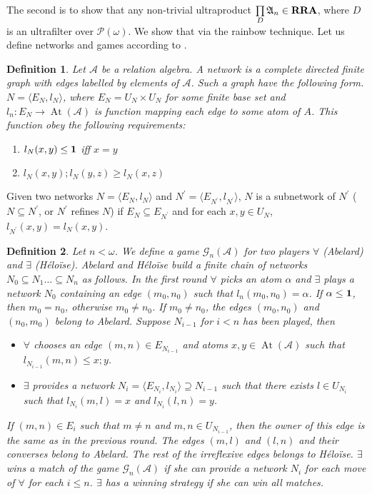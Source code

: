 \documentclass[a4paper]{article}
\theoremstyle{defin}
\newtheorem{defin}{Definition}
\theoremstyle{theorem}
\theoremstyle{prop}
\theoremstyle{lemma}
\theoremstyle{ex}
\theoremstyle{col}
\begin{document}
The second is to show that any non-trivial ultraproduct $\prod \limits_{D} \mathfrak{A}_n \in {\bf RRA}$, where $D$ is an ultrafilter over $\mathcal{P}(\omega)$. We show that via the rainbow technique. Let us define networks and games according to \cite{hirsch1997step}.

\begin{defin}
  Let $\mathcal{A}$ be a relation algebra. A network is a complete directed finite graph with edges labelled by elements of $\mathcal{A}$. Such a graph have the following form. $N = \langle E_N, l_N \rangle$, where $E_N = U_N \times U_N$ for some finite base set and $l_n : E_N \to \operatorname{At}(\mathcal{A})$ is function mapping each edge to some atom of $A$. This function obey the following requirements:
  \begin{enumerate}
    \item $l_N(x,y) \leq {\bf 1}$ iff $x = y$
    \item $l_N(x, y) ; l_N(y,z) \geq l_N(x,z)$
  \end{enumerate}
\end{defin}
Given two networks $N = \langle E_N, l_N \rangle$ and $N^{'} = \langle E_{N^{'}}, l_{N^{'}} \rangle$, $N$ is a subnetwork of $N^{'}$ ($N \subseteq N^{'}$, or $N^{'}$ refines $N$) if $E_N \subseteq E_{N^{'}}$ and for each $x,y \in U_N$, $l_{N^{'}}(x,y) = l_{N}(x,y)$.

\begin{defin}
  Let $n < \omega$. We define a game $\mathcal{G}_n(\mathcal{A})$ for two players $\forall$ (Abelard) and $\exists$ (H\'{e}lo\"{i}se). Abelard and H\'{e}lo\"{i}se build a finite chain of networks $N_0 \subseteq N_1 \dots \subseteq N_n$ as follows. In the first round $\forall$ picks an atom $\alpha$ and $\exists$ plays a network $N_0$ containing an edge $(m_0, n_0)$ such that $l_n(m_0, n_0) = \alpha$. If $\alpha \leq {\bf 1}$, then $m_0 = n_0$, otherwise $m_0 \neq n_0$. If $m_0 \neq n_0$, the edges $(m_0, n_0)$ and $(n_0, m_0)$ belong to Abelard. Suppose $N_{i-1}$ for $i < n$ has been played, then
  \begin{itemize}
    \item $\forall$ chooses an edge $(m, n) \in E_{N_{i - 1}}$ and atoms $x, y \in \operatorname{At}(\mathcal{A})$ such that $l_{N_{i - 1}}(m,n) \leq x ; y$.
    \item $\exists$ provides a network $N_i = \langle E_{N_i}, l_{N_i} \rangle \supseteq N_{i - 1}$ such that there exists
    $l \in U_{N_i}$ such that $l_{N_i}(m, l) = x$ and $l_{N_i}(l, n) = y$.
  \end{itemize}
  If $(m,n) \in E_i$ such that $m \neq n$ and $m, n \in U_{N_{i - 1}}$, then the owner of this edge is the same as in the previous round.
  The edges $(m, l)$ and $(l, n)$ and their converses belong to Abelard. The rest of the irreflexive edges belongs to H\'{e}lo\"{i}se. $\exists$ wins a match of the game $\mathcal{G}_n(\mathcal{A})$ if she can provide a network $N_i$ for each move of $\forall$ for each $i \leq n$.
  $\exists$ has a winning strategy if she can win all matches.
\end{defin}
\end{document}
